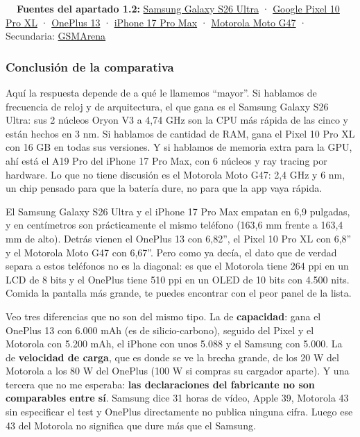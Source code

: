 \begin{fuentesbox}
\textbf{\color{muted}\faBook\ \ Fuentes del apartado 1.2:}
\href{https://www.samsung.com/es/smartphones/galaxy-s26-ultra/}{Samsung Galaxy S26 Ultra} ·
\href{https://store.google.com/product/pixel_10_pro_specs}{Google Pixel 10 Pro XL} ·
\href{https://www.oneplus.com/es/13/specs}{OnePlus 13} ·
\href{https://support.apple.com/es-es/125091}{iPhone 17 Pro Max} ·
\href{https://www.motorola.com/sa/en/p/phones/moto-g/47/pmipmjs44mz}{Motorola Moto G47} ·
Secundaria: \href{https://www.gsmarena.com/}{GSMArena}
\end{fuentesbox}
\subsubsection*{Conclusión de la comparativa}


Aquí la respuesta depende de a qué le llamemos \enquote{mayor}. Si hablamos de frecuencia de reloj y de arquitectura, el que gana es el Samsung Galaxy S26 Ultra: sus 2 núcleos Oryon V3 a 4,74 GHz son la CPU más rápida de las cinco y están hechos en 3 nm. Si hablamos de cantidad de RAM, gana el Pixel 10 Pro XL con 16 GB en todas sus versiones. Y si hablamos de memoria extra para la GPU, ahí está el A19 Pro del iPhone 17 Pro Max, con 6 núcleos y ray tracing por hardware. Lo que no tiene discusión es el Motorola Moto G47: 2,4 GHz y 6 nm, un chip pensado para que la batería dure, no para que la app vaya rápida.


El Samsung Galaxy S26 Ultra y el iPhone 17 Pro Max empatan en 6,9 pulgadas, y en centímetros son prácticamente el mismo teléfono (163,6 mm frente a 163,4 mm de alto). Detrás vienen el OnePlus 13 con 6,82'', el Pixel 10 Pro XL con 6,8'' y el Motorola Moto G47 con 6,67''. Pero como ya decía, el dato que de verdad separa a estos teléfonos no es la diagonal: es que el Motorola tiene 264 ppi en un LCD de 8 bits y el OnePlus tiene 510 ppi en un OLED de 10 bits con 4.500 nits. Comida la pantalla más grande, te puedes encontrar con el peor panel de la lista.


Veo tres diferencias que no son del mismo tipo. La de \textbf{capacidad}: gana el OnePlus 13 con 6.000 mAh (es de silicio-carbono), seguido del Pixel y el Motorola con 5.200 mAh, el iPhone con unos 5.088 y el Samsung con 5.000. La de \textbf{velocidad de carga}, que es donde se ve la brecha grande, de los 20 W del Motorola a los 80 W del OnePlus (100 W si compras su cargador aparte). Y una tercera que no me esperaba: \textbf{las declaraciones del fabricante no son comparables entre sí}. Samsung dice 31 horas de vídeo, Apple 39, Motorola 43 sin especificar el test y OnePlus directamente no publica ninguna cifra. Luego ese 43 del Motorola no significa que dure más que el Samsung.

